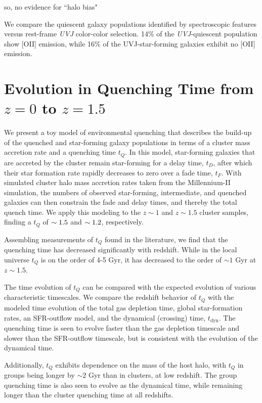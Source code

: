 so, no evidence for ``halo bias"

We compare the quiescent galaxy populations identified by spectroscopic features versus rest-frame \textit{UVJ} color-color selection.
14\% of the \textit{UVJ}-quiescent population show [O\textsc{II}] emission, while 16\% of the UVJ-star-forming galaxies exhibit no [O\textsc{II}] emission.

\section{Evolution in Quenching Time from $z=0$ to $z=1.5$}

We present a toy model of environmental quenching that describes the build-up of the quenched and star-forming galaxy populations in terms of a cluster mass accretion rate and a quenching time $t_Q$.
In this model, star-forming galaxies that are accreted by the cluster remain star-forming for a delay time, $t_D$, after which their star formation rate rapidly decreases to zero over a fade time, $t_F$.
With simulated cluster halo mass accretion rates taken from the Millennium-\textsc{II} simulation, the numbers of observed star-forming, intermediate, and quenched galaxies can then constrain the fade and delay times, and thereby the total quench time.
We apply this modeling to the $z\sim1$ and $z\sim1.5$ cluster samples, finding a $t_Q$ of $\sim1.5$ and $\sim1.2$, respectively.

Assembling measurements of $t_Q$ found in the literature, we find that the quenching time has decreased significantly with redshift.
While in the local universe $t_Q$ is on the order of 4-5 Gyr, it has decreased to the order of $\sim1$ Gyr at $z\sim1.5$.

The time evolution of $t_Q$ can be compared with the expected evolution of various characteristic timescales.
We compare the redshift behavior of $t_Q$ with the modeled time evolution of the total gas depletion time, global star-formation rates, an SFR-outflow model, and the dynamical (crossing) time, $t_\mathrm{dyn}$.
The quenching time is seen to evolve faster than the gas depletion timescale and slower than the SFR-outflow timescale, but is consistent with the evolution of the dynamical time.

Additionally, $t_Q$ exhibits dependence on the mass of the host halo, with $t_Q$ in groups being longer by $\sim2$ Gyr than in clusters, at low redshift.
The group quenching time is also seen to evolve as the dynamical time, while remaining longer than the cluster quenching time at all redshifts.

